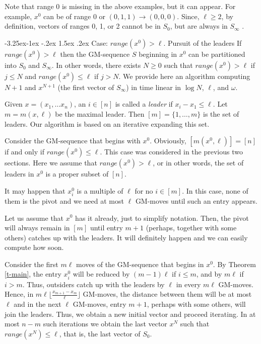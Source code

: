 \documentclass[10pt]{article}
\makeatletter
\renewcommand\subsection{\@startsection{subsection}{2}{\z@}
{-3.25ex\@plus -1ex \@minus -.2ex}
{1.5ex \@plus .2ex}
{\normalfont\normalsize\bfseries\boldmath}}
\theoremstyle{definition}
\makeatother
\begin{document}
Note that range 0 is missing in the above examples, 
but it can appear.  
For example, $x^0$  can be of range 0  or 
$(0,1, 1) \to (0,0,0)$.  
Since, $\ell \geq 2$, by definition,    
vectors of ranges  0, 1, or 2  
cannot be in $S_0$, but are always in $S_\infty$ .  

\subsection{Case: $range(x^0) > \ell$. Pursuit of the leaders}
\label{ss-racing} 
If  $range(x^0) > \ell$  then the GM-sequence  
$S$ beginning in  $x^0$  can be partitioned 
into  $S_0$  and  $S_\infty$. 
In other words, there exists $N \geq 0$ such that 
$range(x^0) > \ell$  if $j \leq N$  and 
$range(x^0) \leq \ell$  if $j > N$.  
We provide here an algorithm computing 
$N+1$  and  $x^{N+1}$ 
(the first vector of $S_\infty$)  
in time linear in  $\log N$, $\ell$, and $\omega$. 
  
Given $x = (x_1, \ldots x_n)$,  
an $i \in [n]$ is called a {\em leader} 
if  $x_i - x_1 \leq \ell$. 
Let $m = m(x, \ell)$  be the maximal leader. 
Then $[m] = \{1, \ldots, m\}$ is the set of leaders. 
Our algorithm is based on 
an iterative expanding this set.

Consider the GM-sequence that begins with $x^0$. 
Obviously, $[m(x^0, \ell)] = [n]$  
if and only if  $range(x^0) \leq \ell$. 
This case was considered in the previous two sections. 
Here we assume that $range(x^0) > \ell$, 
or in other words, the set of leaders in $x^0$ 
is a proper subset of $[n]$.  

It may happen that  $x_i^0$ 
is a multiple of $\ell$ for no $i \in [m]$. 
In this case, none of them is the pivot  
and we need at most $\ell$ GM-moves 
until such an entry appears. 

Let us assume that $x^0$ has it already, 
just to simplify notation.
Then, the pivot will always remain in $[m]$
until entry $m+1$
(perhaps, together with some others) 
catches up with the leaders. 
It will definitely happen 
and we can easily compute how soon. 

Consider the first $m \ell$ moves 
of the GM-sequence that begins in $x^0$. 
By Theorem \ref{t-main},   
the entry $x^0_i$ will be reduced 
by  $(m -1) \ell$ if $i \leq m$,  
and by  $m \ell$ if  $i > m$. 
Thus, outsiders catch up with the leaders 
by  $\ell$  in every $m \ell$ GM-moves. 
Hence, in $m \ell \lfloor \frac{x_{m+1} - x_m}{\ell} \rfloor$  
GM-moves, the distance between them will be at most  $\ell$ 
and  in the next $\ell$ GM-moves, entry 
$m+1$, perhaps with some others, will join the leaders. 
Thus, we obtain a new initial vector and proceed iterating. 
In at most $n - m$  such iterations 
we obtain the last vector $x^N$  
such that $range(x^N) \leq \ell$, 
that is, the last vector of $S_0$. 
\end{document}
